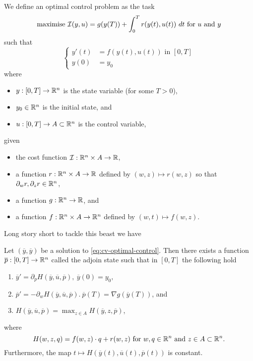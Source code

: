 \begin{dfn}

  We define an optimal control problem as the task
  \begin{equation}
    \label{eq:cv-optimal-control}
    \text{maximise } \mathcal{I}(y, u)
    = g(y(T)) + \int_0^T r(y(t), u(t)) \ dt
    \text{ for } u \text{ and } y
  \end{equation}
  such that
  \begin{equation}
    \begin{cases}
      y'(t) &= f(y(t), u(t)) \text{ in } [0, T] \\
      y(0) &= y_0
    \end{cases}
  \end{equation}
  where
  \begin{itemize}
    \item $y: [0, T] \to \mathbb{R}^n$ is the state variable (for some $T > 0$),
    \item $y_0 \in \mathbb{R}^n$ is the initial state, and
    \item $u : [0, T] \to A \subset \mathbb{R}^n$ is the control variable,
  \end{itemize}
  given
  \begin{itemize}
    \item the cost function $\mathcal{I}: \mathbb{R}^n \times A \to \mathbb{R}$,
    \item a function $r : \mathbb{R}^n \times A \to \mathbb{R}$ defined by $(w, z) \mapsto r(w,
      z)$ so that $\partial_w r, \partial_z r \in \mathbb{R}^n$,
    \item a function $g : \mathbb{R}^n \to \mathbb{R}$, and
    \item a function $f : \mathbb{R}^n \times A \to \mathbb{R}^n$ defined by $(w, t) \mapsto f(w, z)$.
  \end{itemize}
\end{dfn}

Long story short to tackle this beast we have

\begin{thm}
  
  Let $(\overline{y}, \overline{y})$ be a solution to
  \eqref{eq:cv-optimal-control}. Then there exists a function $\overline{p} :
  [0, T] \to \mathbb{R}^n$ called the adjoin state such that in $[0, T]$ the following
  hold
  \begin{enumerate}
    \item $\overline{y}' = \partial_p H(\overline{y}, \overline{u},
      \overline{p}),\ \overline{y}(0) = y_0,$
    \item $\overline{p}' = - \partial_w H(\overline{y}, \overline{u},
      \overline{p}).\ \overline{p}(T) = \nabla g(\overline{y}(T))$, and
    \item $H(\overline{y}, \overline{u}, \overline{p}) = \max_{z \in A}
      H(\overline{y}, z, \overline{p})$,
  \end{enumerate}
  where
  \[
    H(w, z, q) = f(w, z) \cdot q + r(w, z) \text{ for } w, q \in \mathbb{R}^n \text{ and } z \in A \subset \mathbb{R}^n.
  \]
  Furthermore, the map $t \mapsto H(\overline{y}(t), \overline{u}(t), \overline{p}(t))$ is constant.
\end{thm}

